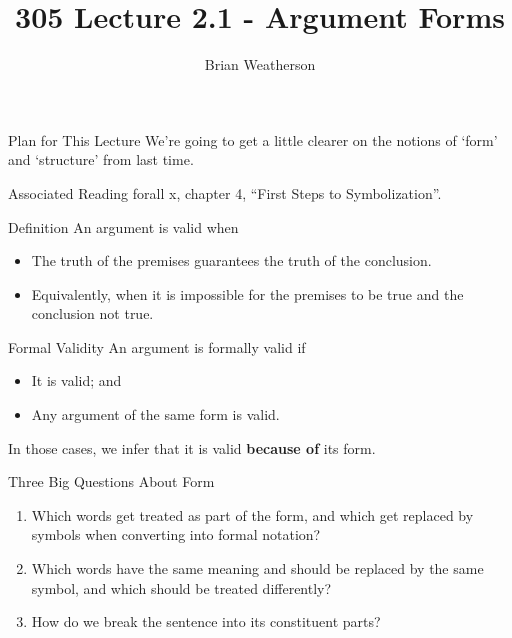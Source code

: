 \documentclass[
  ignorenonframetext,
]{beamer}
\title{305 Lecture 2.1 - Argument Forms}
\author{Brian Weatherson}
\date{}
\providecommand{\tightlist}{%
  \setlength{\itemsep}{0pt}\setlength{\parskip}{0pt}}
\renewcommand{\,}{\text{, }}
\begin{document}
\frame{\titlepage}

\begin{frame}{Plan for This Lecture}
\protect\hypertarget{plan-for-this-lecture}{}
We're going to get a little clearer on the notions of `form' and
`structure' from last time.
\end{frame}

\begin{frame}{Associated Reading}
\protect\hypertarget{associated-reading}{}
forall x, chapter 4, ``First Steps to Symbolization''.
\end{frame}

\begin{frame}{Definition}
\protect\hypertarget{definition}{}
An argument is valid when

\begin{itemize}
\tightlist
\item
  The truth of the premises guarantees the truth of the conclusion.
\item
  Equivalently, when it is impossible for the premises to be true and
  the conclusion not true.
\end{itemize}
\end{frame}

\begin{frame}{Formal Validity}
\protect\hypertarget{formal-validity}{}
An argument is formally valid if

\begin{itemize}
\tightlist
\item
  It is valid; and
\item
  Any argument of the same form is valid.
\end{itemize}

In those cases, we infer that it is valid \textbf{because of} its form.
\end{frame}

\begin{frame}{Three Big Questions About Form}
\protect\hypertarget{three-big-questions-about-form}{}
\begin{enumerate}[<+->]
\tightlist
\item
  Which words get treated as part of the form, and which get replaced by
  symbols when converting into formal notation?
\item
  Which words have the same meaning and should be replaced by the same
  symbol, and which should be treated differently?
\item
  How do we break the sentence into its constituent parts?
\end{enumerate}
\end{frame}
\end{document}

